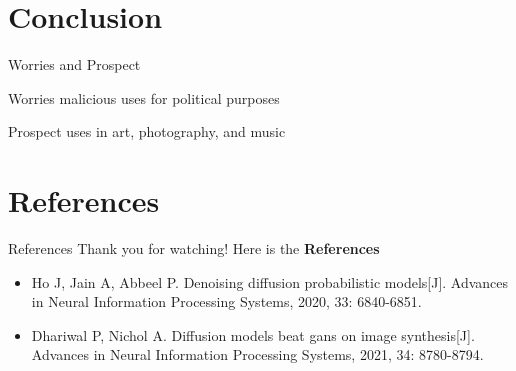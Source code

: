 \documentclass[aspectratio=169]{beamer}
\begin{document}
\section{Conclusion}

\begin{frame}{Worries and Prospect}
    \begin{block}{Worries}
        malicious uses for political purposes
    \end{block}
    \begin{block}{Prospect}
        uses in art, photography, and music
    \end{block}
\end{frame}
\section*{References}
\begin{frame}{References}
    Thank you for watching!
    \vfill
    Here is the \textbf{References}
    \begin{itemize}
        \item Ho J, Jain A, Abbeel P. Denoising diffusion probabilistic models[J]. Advances in Neural Information Processing Systems, 2020, 33: 6840-6851.
        \item Dhariwal P, Nichol A. Diffusion models beat gans on image synthesis[J]. Advances in Neural Information Processing Systems, 2021, 34: 8780-8794.
    \end{itemize}
    \vfill
\end{frame}
\end{document}
